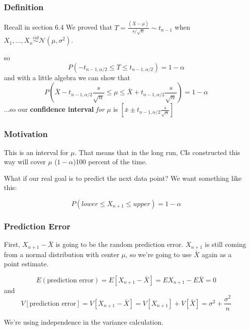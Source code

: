 \documentclass{beamer}
\begin{document}
\begin{frame}
\frametitle{Definition}

Recall in section 6.4 We proved that $T = \frac{(\bar{X} - \mu)}{s / \sqrt{n}} \sim t_{n-1}$ when $X_1, \ldots, X_n \overset{iid}{\sim} \mathcal{N}(\mu, \sigma^2)$.
\newline

so
\[
P \left(-t_{n-1, \alpha/2} \le T \le t_{n-1, \alpha/2} \right) = 1- \alpha
\]
and with a little algebra we can show that 
\[
P \left(\bar{X} -t_{n-1, \alpha/2}\frac{s}{\sqrt{n}} \le \mu \le \bar{X} +t_{n-1, \alpha/2}\frac{s}{\sqrt{n}}  \right) = 1- \alpha
\]
...so our \textbf{confidence interval} \emph{for $\mu$} is $[\bar{x} \pm t_{n-1, \alpha/2}\frac{s}{\sqrt{n}}]$
\end{frame}

\begin{frame}
\frametitle{Motivation}

This is an interval for $\mu$. That means that in the long run, CIs constructed this way will cover $\mu$ ($1-\alpha$)100 percent of the time. 
\newline

What if our real goal is to predict the next data point? We want something like this:

\[
P(lower \le X_{n+1} \le upper) = 1 - \alpha
\]


\end{frame}

\begin{frame}
\frametitle{Prediction Error}

First, $X_{n+1} - \bar{X}$ is going to be the random prediction error. $X_{n+1}$ is still coming from a normal distribution with center $\mu$, so we're going to use $\bar{X}$ again as a point estimate. 
\newline

\[
E(\text{prediction error}) = E[X_{n+1} - \bar{X}] = EX_{n+1} - E\bar{X} = 0
\]
and
\[
V[\text{prediction error}] = V[X_{n+1} - \bar{X}] = V[X_{n+1}] + V[\bar{X}] = \sigma^2 + \frac{\sigma^2}{n}
\]

We're using independence in the variance calculation.

\end{frame}
\end{document}
